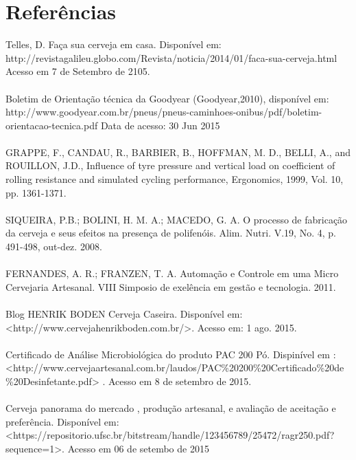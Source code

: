 \clearpage
\section{Referências}

Telles, D. Faça sua cerveja em casa. Disponível em:\\
http://revistagalileu.globo.com/Revista/noticia/2014/01/faca-sua-cerveja.html Acesso em 7 de Setembro de 2105.
\\ \\
Boletim de Orientação técnica da Goodyear (Goodyear,2010), disponível em:\\http://www.goodyear.com.br/pneus/pneus-caminhoes-onibus/pdf/boletim-orientacao-tecnica.pdf Data de acesso: 30 Jun 2015
\\ \\
GRAPPE, F., CANDAU, R., BARBIER, B., HOFFMAN, M. D., BELLI, A., and ROUILLON, J.D., Influence of tyre pressure and vertical load on coefficient of rolling resistance and simulated cycling performance, Ergonomics, 1999, Vol. 10, pp. 1361-1371.
\\ \\
SIQUEIRA, P.B.; BOLINI, H. M. A.; MACEDO, G. A. O processo de fabricação da cerveja e seus efeitos na presença de polifenóis. Alim. Nutri. V.19, No. 4, p. 491-498, out-dez. 2008.
\\ \\
FERNANDES, A. R.; FRANZEN, T. A. Automação e Controle em uma Micro Cervejaria Artesanal. VIII Simposio de exelência em gestão e tecnologia. 2011.
\\ \\
Blog HENRIK BODEN Cerveja Caseira. Disponível em:\\<http://www.cervejahenrikboden.com.br/>. Acesso em: 1 ago. 2015.
\\ \\
Certificado de Análise Microbiológica do produto PAC 200 Pó. Dispinível em :\\ <http://www.cervejaartesanal.com.br/laudos/PAC\%20200\%20Certificado\%20de\%20Desinfetante.pdf> . Acesso em 8 de setembro de 2015.
\\ \\
Cerveja panorama do mercado , produção artesanal, e avaliação de aceitação e preferência. Disponível em:\\ <https://repositorio.ufsc.br/bitstream/handle/123456789/25472/ragr250.pdf?sequence=1>. Acesso em 06 de setembo de 2015
\\ \\
